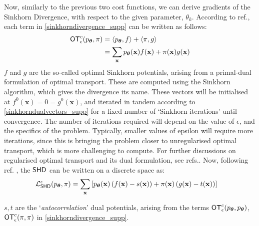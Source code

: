 Now, similarly to the previous two cost functions, we can derive gradients of the Sinkhorn Divergence, with respect to the given parameter, $\theta_k$. According to ref., each term in \eqref{sinkhorndivergence_supp} can be written as follows:
\begin{align}
    \operatorname{\textsf{OT}}^c_\epsilon(p_{\boldsymbol\theta}, \pi) &= \langle p_{\boldsymbol\theta}, f \rangle +  \langle \pi, g \rangle \nonumber \\
    & =\sum\limits_\mathbf{x} p_{\boldsymbol\theta}(\mathbf{x})f(\mathbf{x}) + \pi(\mathbf{x})g(\mathbf{x})
\end{align}
$f$ and $g$ are the so-called optimal Sinkhorn potentials, arising from a primal-dual formulation of optimal transport. These are computed using the Sinkhorn algorithm, which gives the divergence its name. These vectors will be initialised at $f^0(\mathbf{x}) = 0 = g^0(\mathbf{x})$, and iterated in tandem according to \eqref{sinkhorndualvectors_supp} for a fixed number of `Sinkhorn iterations' until convergence. The number of iterations required will depend on the value of $\epsilon$, and the specifics of the problem. Typically, smaller values of epsilon will require more iterations, since this is bringing the problem closer to unregularised optimal transport, which is more challenging to compute. For further discussions on regularised optimal transport and its dual formulation, see refs.. Now, following ref. , the $\operatorname{\textsf{SHD}}$ can be written on a discrete space as:
\begin{align}
    \mathcal{L}_{\operatorname{\textsf{SHD}}}^\epsilon(p_{\boldsymbol\theta}, \pi) = \sum\limits_\mathbf{x}& \left[p_{\boldsymbol\theta}(\mathbf{x})\left(f(\mathbf{x}) - s(\mathbf{x})\right)
    + \pi(\mathbf{x})\left(g(\mathbf{x}) - t(\mathbf{x})\right)\right] \label{sinkhorndualformulation_supp}
\end{align}


$s, t$ are the `\textit{autocorrelation}' dual potentials, arising from the terms $\operatorname{\textsf{OT}}^c_\epsilon(p_{\boldsymbol\theta}, p_{\boldsymbol\theta})$, $\operatorname{\textsf{OT}}^c_\epsilon(\pi, \pi)$ in \eqref{sinkhorndivergence_supp}.

